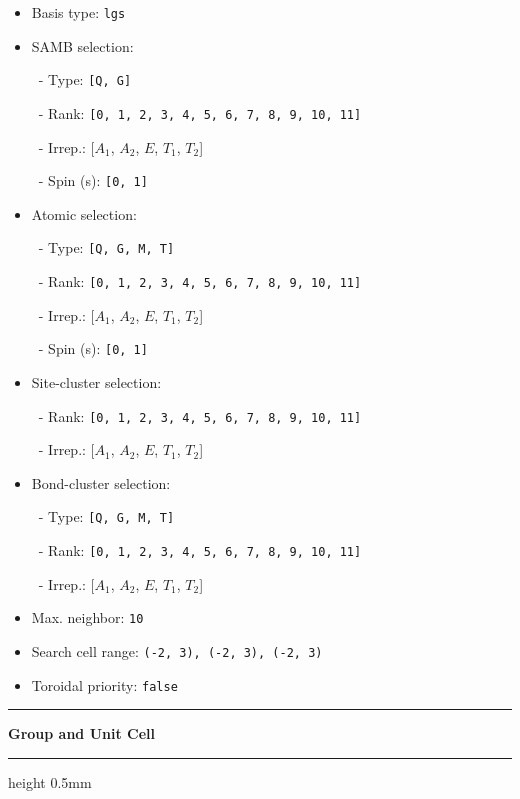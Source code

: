 \documentclass[fleqn,10pt,landscape]{jsarticle}
\begin{document}
\begin{itemize}
\item Basis type: \texttt{lgs}

\item SAMB selection:

\, - Type: \texttt{[Q, G]}

\, - Rank: \texttt{[0, 1, 2, 3, 4, 5, 6, 7, 8, 9, 10, 11]}

\, - Irrep.: [$A_{1}$, $A_{2}$, $E$, $T_{1}$, $T_{2}$]

\, - Spin (s): \texttt{[0, 1]}

\item Atomic selection:

\, - Type: \texttt{[Q, G, M, T]}

\, - Rank: \texttt{[0, 1, 2, 3, 4, 5, 6, 7, 8, 9, 10, 11]}

\, - Irrep.: [$A_{1}$, $A_{2}$, $E$, $T_{1}$, $T_{2}$]

\, - Spin (s): \texttt{[0, 1]}

\item Site-cluster selection:

\, - Rank: \texttt{[0, 1, 2, 3, 4, 5, 6, 7, 8, 9, 10, 11]}

\, - Irrep.: [$A_{1}$, $A_{2}$, $E$, $T_{1}$, $T_{2}$]

\item Bond-cluster selection:

\, - Type: \texttt{[Q, G, M, T]}

\, - Rank: \texttt{[0, 1, 2, 3, 4, 5, 6, 7, 8, 9, 10, 11]}

\, - Irrep.: [$A_{1}$, $A_{2}$, $E$, $T_{1}$, $T_{2}$]

\item Max. neighbor: \texttt{10}

\item Search cell range: \texttt{(-2, 3), (-2, 3), (-2, 3)}

\item Toroidal priority: \texttt{false}

\end{itemize}
\vspace{5mm}
\noindent \rule[0.5mm]{5mm}{0.5mm}\hspace{3mm}\textbf{Group and Unit Cell}\hspace{3mm}\leaders\hrule height 0.5mm\hfill\kern0pt
\vspace{3mm}
\end{document}
